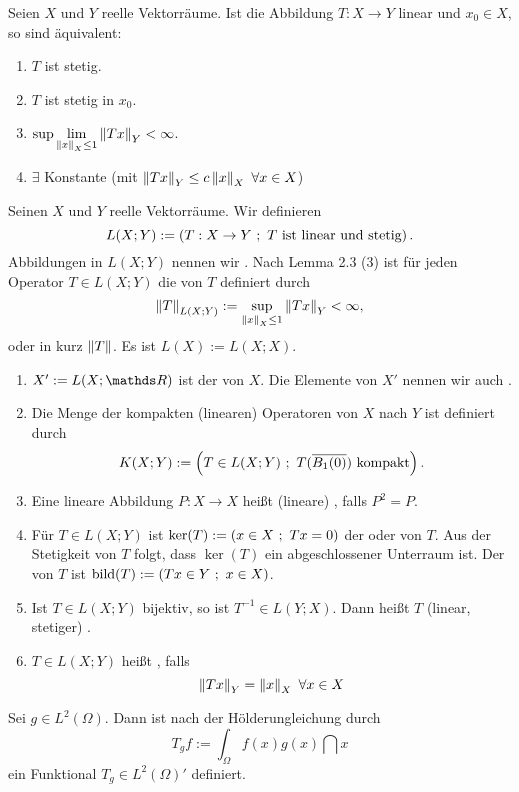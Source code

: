 Seien $X$ und $Y$ reelle Vektorräume.
Ist die Abbildung $T:X\to Y$ linear und $x_0\in X$, so sind äquivalent:
\begin{enumerate}[(1)]
	\item $T$ ist stetig.
	\item $T$ ist stetig in $x_0$.
	\item $\sup\lim\limits_{\left\Vert x\right\Vert_X \le 1} \left\Vert Tx\right\Vert_Y < \infty$.
	\item $\exists$ Konstante (mit $\left\Vert Tx\right\Vert_Y \le c\left\Vert x\right\Vert_X ~\forall x\in X$)
\end{enumerate}

Seinen $X$ und $Y$ reelle Vektorräume.
Wir definieren
\[
L(X;Y) := \left( T:X\to Y~;~ T \text{ ist linear und stetig}\right).
\]
Abbildungen in $L(X;Y)$ nennen wir .
Nach Lemma 2.3 (3) ist für jeden Operator $T\in L(X;Y)$ die  von $T$ definiert durch
\[
\left\Vert T\right\Vert_{L(X;Y)} := \sup\limits_{\left\Vert x\right\Vert_X\le 1} \left\Vert Tx\right\Vert_Y < \infty,
\]
oder in kurz $\left\Vert T\right\Vert$.
Es ist $L(X) := L(X;X)$.

\begin{enumerate}[(1)]
	\item $X' := L(X;\R)$ ist der  von $X$.
	Die Elemente von $X'$ nennen wir auch .
	\item Die Menge der kompakten (linearen) Operatoren von $X$ nach $Y$ ist definiert durch
	\[
	K(X;Y) := \left( T\in L(X;Y)~;~ T(\overline{B_1(0)}) \text{ kompakt}\right).
	\]
	\item Eine lineare Abbildung $P:X\to X$ heißt (lineare) , falls $P^2=P$.
	\item Für $T\in L(X;Y)$ ist $\ker(T) := \left( x\in X~;~ Tx = 0\right)$ der  oder  von $T$.
	Aus der Stetigkeit von $T$ folgt, dass $\ker(T)$ ein abgeschlossener Unterraum ist.
	Der  von $T$ ist $\operatorname{bild}(T) := \left( Tx\in Y~;~x\in X\right)$.
	\item Ist $T\in L(X;Y)$ bijektiv, so ist $T^{-1}\in L(Y;X)$.
	Dann heißt $T$ (linear, stetiger) .
	\item $T\in L(X;Y)$ heißt , falls
	\[
	\left\Vert Tx\right\Vert_Y = \left\Vert x\right\Vert_X ~\forall x\in X
	\]
\end{enumerate}

Sei $g\in L^2(\Omega)$.
Dann ist nach der Hölderungleichung durch 
\[
T_g f := \int_{\Omega} f(x) g(x)\dint x
\]
ein Funktional $T_g\in  L^2(\Omega)'$ definiert.

